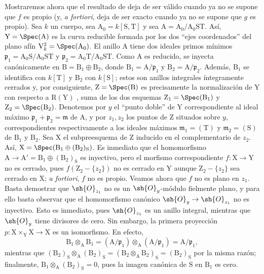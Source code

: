 \begin{env}[11.7.2]
\label{IV.11.7.2}
Mostraremos ahora que el resultado de  deja de ser válido cuando ya no se supone que $f$ es propio (y, \emph{a fortiori},  deja de ser exacto cuando ya no se supone que $g$ es propio).
Sea $k$ un cuerpo, sea $\mathrm{A}_0=k[\mathrm{S},\mathrm{T}]$ y sea $\mathrm{A}=\mathrm{A}_0/\mathrm{A}_0\mathrm{S}\mathrm{T}$. Así, $\mathrm{Y}=\Spec(\mathrm{A})$ es la curva reducible formada por los dos ``ejes coordenados'' del plano afín $\mathrm{V}_k^2=\Spec(\mathrm{A}_0)$.
El anillo $\mathrm{A}$ tiene dos ideales primos mínimos $\mathfrak{p}_1=\mathrm{A}_0\mathrm{S}/\mathrm{A}_0\mathrm{S}\mathrm{T}$ y $\mathfrak{p}_2=\mathrm{A}_0\mathrm{T}/\mathrm{A}_0\mathrm{S}\mathrm{T}$. Como $\mathrm{A}$ es reducido, se inyecta canónicamente en $\mathrm{B}=\mathrm{B}_1\oplus\mathrm{B}_2$, donde $\mathrm{B}_1=\mathrm{A}/\mathfrak{p}_1$ y $\mathrm{B}_2=\mathrm{A}/\mathfrak{p}_2$. Además, $\mathrm{B}_1$ se identifica con $k[\mathrm{T}]$ y $\mathrm{B}_2$ con $k[\mathrm{S}]$; estos son anillos integrales íntegramente cerrados y, por consiguiente, $\mathrm{Z}=\Spec(\mathrm{B})$ es precisamente la normalización de $\mathrm{Y}$ con respecto a $\mathrm{R}(\mathrm{Y})$ , suma de los dos esquemas $\mathrm{Z}_1=\Spec(\mathrm{B}_1)$ y $\mathrm{Z}_2=\Spec(\mathrm{B}_2)$.
Denotemos por $y$ el ``punto doble'' de $\mathrm{Y}$ correspondiente al ideal máximo $\mathfrak{p}_1+\mathfrak{p}_2=\mathfrak{m}$ de $\mathrm{A}$, y por $z_1,z_2$ los puntos de $\mathrm{Z}$ situados sobre $y$, correspondientes respectivamente a los ideales máximos $\mathfrak{m}_1=(\mathrm{T})$ y $\mathfrak{m}_2=(\mathrm{S})$ de $\mathrm{B}_1$ y $\mathrm{B}_2$.
Sea $\mathrm{X}$ el subpreesquema de $\mathrm{Z}$ inducido en el complementario de $z_2$. Así, $\mathrm{X}=\Spec(\mathrm{B}_1\oplus(\mathrm{B}_2)_\mathrm{S})$. Es inmediato que el homomorfismo $\mathrm{A}\to\mathrm{A}'=\mathrm{B}_1\oplus(\mathrm{B}_2)_\mathrm{S}$ es inyectivo, pero el morfismo correspondiente $f:\mathrm{X}\to\mathrm{Y}$ no es cerrado, pues $f(\mathrm{Z}_2-\{z_2\})$ no es cerrado en $\mathrm{Y}$ aunque $\mathrm{Z}_2-\{z_2\}$ sea cerrado en $\mathrm{X}$; \emph{a fortiori}, $f$ no es propio.
Veamos ahora que $f$ no es plano en $z_1$. Basta demostrar  que $\sh{O}_{z_1}$ no es un $\sh{O}_y$-módulo fielmente plano, y para ello basta observar que el homomorfismo canónico $\sh{O}_y\to\sh{O}_{z_1}$ no es inyectivo. Esto es inmediato, pues $\sh{O}_{z_1}$ es un anillo integral, mientras que $\sh{O}_y$ tiene divisores de cero.
Sin embargo, la primera proyección $p:\mathrm{X}\times_\mathrm{Y}\mathrm{X}\to\mathrm{X}$ es un isomorfismo. En efecto,
\[
\mathrm{B}_1\otimes_\mathrm{A}\mathrm{B}_1
=(\mathrm{A}/\mathfrak{p}_1)\otimes_\mathrm{A}(\mathrm{A}/\mathfrak{p}_1)
=\mathrm{A}/\mathfrak{p}_1,
\]
mientras que $(\mathrm{B}_2)_\mathrm{S}\otimes_\mathrm{A}(\mathrm{B}_2)_\mathrm{S}=(\mathrm{B}_2\otimes_\mathrm{A}\mathrm{B}_2)_\mathrm{S}=(\mathrm{B}_2)_\mathrm{S}$ por la misma razón; finalmente, $\mathrm{B}_1\otimes_\mathrm{A}(\mathrm{B}_2)_\mathrm{S}=0$, pues la imagen canónica de $\mathrm{S}$ en $\mathrm{B}_1$ es cero.
\end{env}

